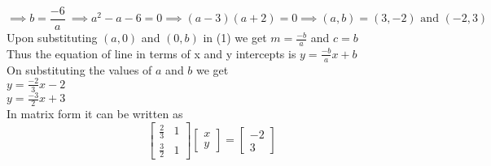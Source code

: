 \documentclass[12pt]{article}
\begin{document}
\begin{equation}
\implies b = \frac{-6}{a}\  
\implies a^2 - a -6 =0
\implies (a-3)(a+2)=0
	\implies (a,b)=(3,-2) \text{ and } (-2,3)
\end{equation}
\vspace{1ex}
Upon substituting $ (a,0) $ and $ (0,b) $ in (1) we get 
$ m= \frac{-b}{a} $ and $ c = b $\\
Thus the equation of line in terms of x and y intercepts is $ y = \frac{-b}{a}x+ b $ \\
On substituting the values of $ a $ and $ b $ we get \\ 
$ y = \frac{-2}{3}x - 2 $ \\
$ y = \frac{-3}{2}x + 3 $ \\
In matrix form it can be written as 
\begin{equation}
\begin{bmatrix}
	\frac{2}{3} &  1 \\
	\frac{3}{2} &  1
\end{bmatrix}
\begin{bmatrix}
	x \\
	y
\end{bmatrix}
=
	\begin{bmatrix}
		-2 \\
		 3
	\end{bmatrix}
\end{equation}
\end{document}
